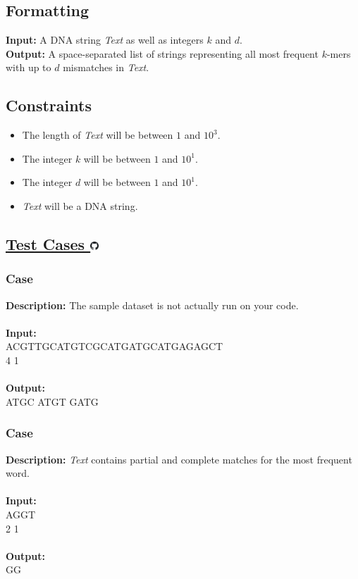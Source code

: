 \documentclass{article}
\newcommand{\code}[1]{{\fontfamily{pcr}\selectfont #1}}
\newcommand{\gitlogo}{\includegraphics[height=12.5]{c0/gitlogo.png}}
\begin{document}
\subsection*{Formatting}
\textbf{Input:} A DNA string \emph{Text} as well as integers $k$ and $d$.\\
\noindent \textbf{Output:} A space-separated list of strings representing all most frequent $k$-mers with up to $d$ mismatches in \emph{Text}.

\subsection*{Constraints}
\begin{itemize}
    \item The length of \emph{Text} will be between $1$ and $10^3$.
    \item The integer $k$ will be between $1$ and $10^1$.
    \item The integer $d$ will be between $1$ and $10^1$.
    \item \emph{Text} will be a DNA string.
\end{itemize}
\pagebreak

\subsection*{\href{https://github.com/rjeveloff/BA_problemregister/tree/main/test_cases/chapter_1/1I}{Test Cases \gitlogo}}
\subsubsection*{Case }
\hline \vspace{5}
\textbf{Description:} The sample dataset is not actually run on your code.\\ \\
\noindent \textbf{Input:}\\
\code{ACGTTGCATGTCGCATGATGCATGAGAGCT\\4 1}\\ \\
\noindent \textbf{Output:}\\
\code{ATGC ATGT GATG}

\subsubsection*{Case }
\hline \vspace{5}
\textbf{Description:} \emph{Text} contains partial and complete matches for the most frequent word.\\ \\
\noindent \textbf{Input:}\\
\code{AGGT\\2 1}\\ \\
\noindent \textbf{Output:}\\
\code{GG}
\end{document}
